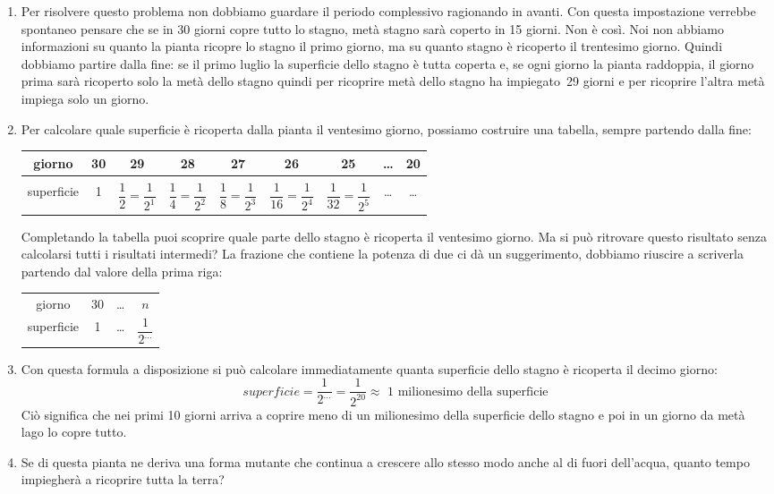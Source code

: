 \begin{enumerate}
 \item
Per risolvere questo problema non dobbiamo guardare il periodo complessivo 
ragionando in avanti. Con questa impostazione verrebbe spontaneo pensare che se 
in 30 giorni copre tutto lo stagno, metà stagno sarà coperto in 15 giorni. Non 
è così.
Noi non abbiamo informazioni su quanto la pianta ricopre lo stagno il primo 
giorno, ma su quanto stagno è ricoperto il trentesimo giorno.
Quindi dobbiamo partire dalla fine: se il primo luglio la superficie dello 
stagno è tutta coperta e, se ogni giorno la pianta raddoppia, il giorno prima 
sarà ricoperto solo la metà dello stagno quindi per ricoprire metà dello stagno 
ha impiegato~29 giorni e per ricoprire l'altra metà impiega solo un giorno.

 \item
Per calcolare quale superficie è ricoperta dalla pianta il ventesimo giorno, 
possiamo costruire una tabella, sempre partendo dalla fine:

\begin{center}
\begin{tabular}{c|c|c|c|c|c|c|c|c}
giorno & 30 & 29 & 28 & 27 & 26 & 25 & \dots & 20\\[6pt]
\hline &&&&&&&&\\ [-6pt]
superficie & 1 & \(\dfrac{1}{2}=\dfrac{1}{2^1}\) & 
 \(\dfrac{1}{4}=\dfrac{1}{2^2}\) & 
 \(\dfrac{1}{8}=\dfrac{1}{2^3}\) & 
 \(\dfrac{1}{16}=\dfrac{1}{2^4}\) & 
 \(\dfrac{1}{32}=\dfrac{1}{2^5}\) & \dots & \dots\\
\end{tabular}
\end{center}

Completando la tabella puoi scoprire quale parte dello stagno è ricoperta il 
ventesimo giorno. Ma si può ritrovare questo risultato senza calcolarsi tutti i 
risultati intermedi?
La frazione che contiene la potenza di due ci dà un suggerimento, dobbiamo 
riuscire a scriverla partendo dal valore della prima riga:

\begin{center}
\begin{tabular}{cccc}
giorno & 30 & \dots & \(n\) \\
superficie & 1 & \dots & \(\dfrac{1}{2^{\dots}}\) \\
\end{tabular}
\end{center}

 \item
Con questa formula a disposizione si può calcolare immediatamente quanta 
superficie dello stagno è ricoperta il decimo giorno:
\[superficie = \dfrac{1}{2^{\dots}} = \dfrac{1}{2^{20}} \approx 
\text{ 1 milionesimo della superficie}\]
Ciò significa che nei primi 10 giorni arriva a coprire meno di un milionesimo 
della superficie dello stagno e poi in un giorno da metà lago lo copre tutto.
 \item
Se di questa pianta ne deriva una forma mutante che continua a crescere allo 
stesso modo anche al di fuori dell'acqua, quanto tempo impiegherà a ricoprire 
tutta la terra?
\end{enumerate}

